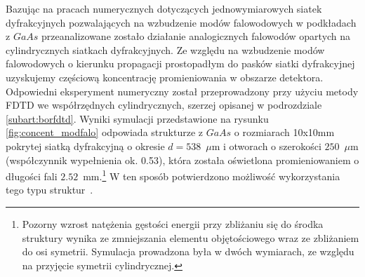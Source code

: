 Bazując na pracach numerycznych dotyczących  jednowymiarowych siatek dyfrakcyjnych pozwalających na wzbudzenie modów falowodowych w podkładach z $GaAs$ przeanalizowane zostało działanie analogicznych falowodów opartych na cylindrycznych siatkach dyfrakcyjnych. Ze względu na wzbudzenie modów falowodowych o kierunku propagacji prostopadłym do pasków siatki dyfrakcyjnej uzyskujemy częściową koncentrację promieniowania w obszarze detektora. Odpowiedni eksperyment numeryczny został przeprowadzony przy użyciu metody FDTD we współrzędnych cylindrycznych, szerzej opisanej w podrozdziale \ref{subart:borfdtd}. Wyniki symulacji przedstawione na rysunku \ref{fig:concent_modfalo} odpowiada strukturze z $GaAs$ o rozmiarach 10x10mm pokrytej siatką dyfrakcyjną o okresie $d=538$~$\mu$m i otworach o szerokości $250$~$\mu$m (współczynnik wypełnienia ok. 0.53), która została oświetlona promieniowaniem o długości fali $2.52$~mm.\footnote{Pozorny wzrost natężenia gęstości energii przy zbliżaniu się do środka struktury wynika ze zmniejszania elementu objętościowego wraz ze zbliżaniem do osi symetrii. Symulacja prowadzona była w dwóch wymiarach, ze względu na przyjęcie symetrii cylindrycznej.} W ten sposób potwierdzono możliwość wykorzystania tego typu struktur~\cite{Stolarek2011}.

